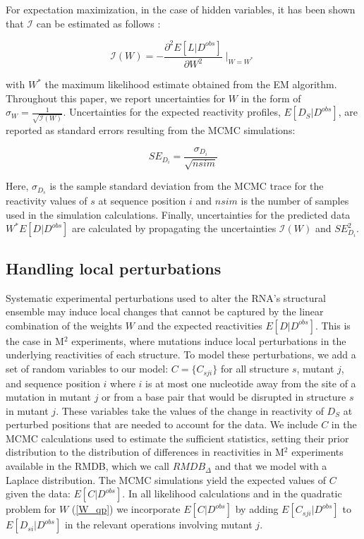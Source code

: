 \documentclass[12pt]{article}
\begin{document}
For expectation maximization, in the case of hidden variables, it has been shown that $\mathcal{I}$ can be estimated as follows \cite{Oakes1999}:

\[\mathcal{I}(W) = -\frac{\partial^2 E[L| D^{obs}]}{\partial W^2}\mid_{W=W^*}\]
 
with $W^*$ the maximum likelihood estimate obtained from the EM algorithm.
 Throughout this paper, we report uncertainties for $W$ in the form of $\sigma_W = \frac{1}{\sqrt{\mathcal{I}(W)}}$. 
 Uncertainties for the expected reactivity profiles, $E[D_S|D^{obs}]$, are reported as standard errors resulting from the MCMC simulations:

\[SE_{D_{i}} = \frac{\sigma_{D_{i}}}{\sqrt{nsim}}\]

Here, $\sigma_{D_{s}}$ is the sample standard deviation from the MCMC trace for the reactivity values of $s$ at sequence position $i$ and $nsim$ is the number of samples used in the simulation calculations.
 Finally, uncertainties for the predicted data $W^*E[D|D^{obs}]$ are calculated by propagating the uncertainties $\mathcal{I}(W)$ and $SE_{D_{i}}^2$.

\subsection{Handling local perturbations}

Systematic experimental perturbations used to alter the RNA's structural ensemble may induce local changes that cannot be captured by the linear combination of the weights $W$ and the expected reactivities $E[D|D^{obs}]$. 
This is the case in M$^2$ experiments, where mutations induce local perturbations in the underlying reactivities of each structure. 
To model these perturbations, we add a set of random variables to our model: $C = \{ C_{sji} \}$ for all structure $s$, mutant $j$, and sequence position $i$ where $i$ is at most one nucleotide away from the site of a mutation in mutant $j$ or from a base pair that would be disrupted in structure $s$ in mutant $j$. 
These variables take the values of the change in reactivity of $D_S$ at perturbed positions that are needed to account for the data. 
We include $C$ in the MCMC calculations used to estimate the sufficient statistics, setting their prior distribution to the distribution of differences in reactivities in M$^2$ experiments available in the RMDB, which we call $RMDB_{\Delta}$ and that we model with a Laplace distribution. 
The MCMC simulations yield the expected values of $C$ given the data: $E[C|D^{obs}]$. 
In all likelihood calculations and in the quadratic problem for $W$ (\ref{W_qp}) we incorporate $E[C|D^{obs}]$ by adding $E[C_{sji}|D^{obs}]$ to  $E[D_{si}|D^{obs}]$ in the relevant operations involving mutant $j$.
\end{document}
